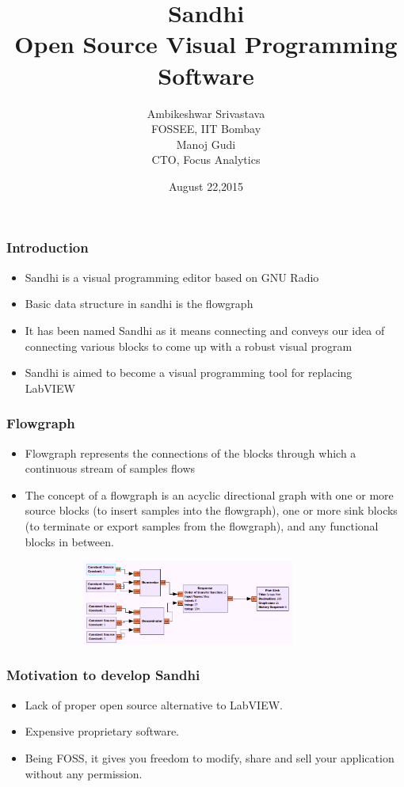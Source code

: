 \documentclass{beamer}
\title[Sandhi
\insertframenumber/\inserttotalframenumber]{Sandhi\\ Open Source Visual Programming Software}
\author[Sandhi Team, IIT Bombay]{Ambikeshwar Srivastava \\FOSSEE, IIT Bombay \\Manoj Gudi\\ CTO, Focus Analytics}
\date{August 22,2015}
\begin{document}
\begin{frame}
\titlepage
\end{frame}

\begin{frame}
	\frametitle{Introduction}
	\begin{itemize}
		\item Sandhi is a visual programming editor based on GNU Radio
		\item Basic data structure in sandhi is the flowgraph
		\item It has been named Sandhi as it means connecting and conveys our idea of connecting various blocks to come up with a robust visual program
		\item Sandhi is aimed to become a visual programming tool for replacing LabVIEW
	\end{itemize}
\end{frame}

\begin{frame}
        \frametitle{Flowgraph}
        \begin{itemize}
        \item Flowgraph represents the connections of the blocks through which a continuous stream of samples flows
        \item The concept of a flowgraph is an acyclic directional graph with one or more source blocks (to insert samples into the flowgraph), one or more sink blocks (to terminate or export samples from the flowgraph), and any functional blocks in between.
        \end{itemize}
	\vspace{-0.14in}
        \begin{figure}
        \centering
        \includegraphics[height=2.8cm, width=10cm]{step_resp.png}
        \end{figure}
        \vspace{-0.2in}

\end{frame}

\begin{frame}
        \frametitle{Motivation to develop Sandhi}
        \begin{itemize}
		\item  Lack of proper open source alternative to LabVIEW.
		\item  Expensive proprietary software.
		\item  Being FOSS, it gives you freedom to modify, share and sell your application without any permission. 
        \end{itemize}
\end{frame}
\end{document}
